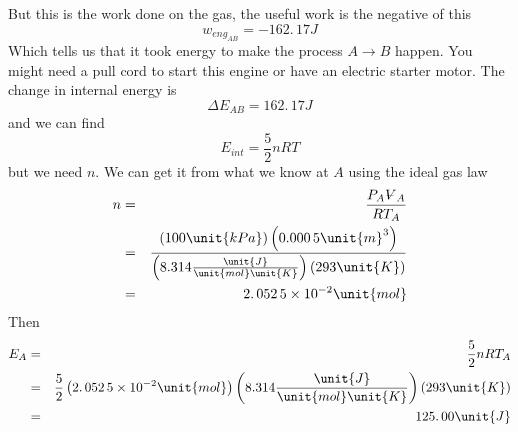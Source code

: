 \documentclass{article}
\begin{document}
But this is the work done on the gas, the useful work is the negative of this%
\[
w_{eng_{AB}}=-\allowbreak 162.\,\allowbreak 17\unit{J} 
\]%
Which tells us that it took energy to make the process $A\rightarrow B$
happen. You might need a pull cord to start this engine or have an electric
starter motor. The change in internal energy is 
\[
\Delta E_{AB}=\allowbreak 162.\,\allowbreak 17\unit{J} 
\]%
and we can find 
\[
E_{int}=\frac{5}{2}nRT 
\]%
but we need $n.$ We can get it from what we know at $A$ using the ideal gas
law%
\begin{eqnarray*}
n &=&\frac{P_{A}%
\ooalign{\hfil$V$\hfil\cr\kern0.1em--\hfil\cr}%
_{A}}{RT_{A}} \\
&=&\frac{\left( 100\unit{kPa}\right) \left( \allowbreak 0.000\,5\unit{m}%
^{3}\right) }{\left( 8.314\frac{\unit{J}}{\unit{mol}\unit{K}}\right) \left(
293\unit{K}\right) } \\
&=&\allowbreak 2.\,\allowbreak 052\,5\times 10^{-2}\unit{mol}
\end{eqnarray*}%
Then%
\begin{eqnarray*}
E_{A} &=&\frac{5}{2}nRT_{A} \\
&=&\frac{5}{2}\left( \allowbreak 2.\,\allowbreak 052\,5\times 10^{-2}\unit{%
mol}\right) \left( 8.314\frac{\unit{J}}{\unit{mol}\unit{K}}\right) \left( 293%
\unit{K}\right) \\
&=&\allowbreak 125.\,\allowbreak 00\unit{J}
\end{eqnarray*}
\end{document}
